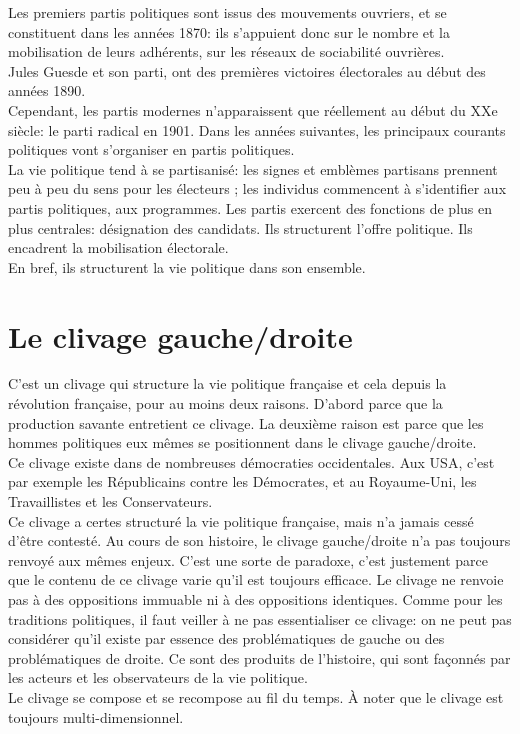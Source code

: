 \documentclass[10pt, a4paper, openany]{book}
\begin{document}
Les premiers partis politiques sont issus des mouvements ouvriers, et se constituent dans les années 1870: ils s'appuient donc sur le nombre et la mobilisation de leurs adhérents, sur les réseaux de sociabilité ouvrières. \\
Jules Guesde et son parti, ont des premières victoires électorales au début des années 1890. \\
Cependant, les partis modernes n'apparaissent que réellement au début du XXe siècle: le parti radical en 1901. Dans les années suivantes, les principaux courants politiques vont s'organiser en partis politiques. \\
La vie politique tend à se partisanisé: les signes et emblèmes partisans prennent peu à peu du sens pour les électeurs ; les individus commencent à s'identifier aux partis politiques, aux programmes. Les partis exercent des fonctions de plus en plus centrales: désignation des candidats. Ils structurent l'offre politique. Ils encadrent la mobilisation électorale. \\
En bref, ils structurent la vie politique dans son ensemble. 

\chapter{Le clivage gauche/droite}

C'est un clivage qui structure la vie politique française et cela depuis la révolution française, pour au moins deux raisons. D'abord parce que la production savante entretient ce clivage. La deuxième raison est parce que les hommes politiques eux mêmes se positionnent dans le clivage gauche/droite. \\
Ce clivage existe dans de nombreuses démocraties occidentales. Aux USA, c'est par exemple les Républicains contre les Démocrates, et au Royaume-Uni, les Travaillistes et les Conservateurs. \\
Ce clivage a certes structuré la vie politique française, mais n'a jamais cessé d'être contesté. Au cours de son histoire, le clivage gauche/droite n'a pas toujours renvoyé aux mêmes enjeux. C'est une sorte de paradoxe, c'est justement parce que le contenu de ce clivage varie qu'il est toujours efficace. Le clivage ne renvoie pas à des oppositions immuable ni à des oppositions identiques. Comme pour les traditions politiques, il faut veiller à ne pas essentialiser ce clivage: on ne peut pas considérer qu'il existe par essence des problématiques de gauche ou des problématiques de droite. Ce sont des produits de l'histoire, qui sont façonnés par les acteurs et les observateurs de la vie politique. \\
Le clivage se compose et se recompose au fil du temps. À noter que le clivage est toujours multi-dimensionnel. 
\end{document}
